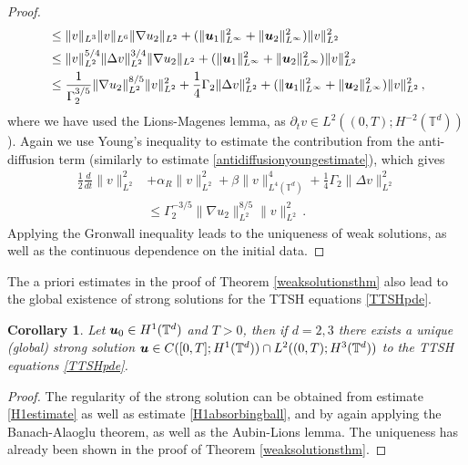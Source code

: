 \documentclass[11pt]{amsart}
\newcommand{\bu}{\mbox{\boldmath$u$}}
\newcommand{\Rb}{\beta}
\newcommand{\Gamtwo}{\Gamma_{2}}
\newtheorem{corollary}[proposition]{Corollary}
\theoremstyle{definition}
\numberwithin{equation}{section}
\numberwithin{equation}{section}
\begin{document}
\begin{proof}
\begin{align*}
&\leq \lVert v \rVert_{L^3} \lVert v \rVert_{L^6} \lVert \nabla u_2 \rVert_{L^2} + (\lVert \bu_1 \rVert_{L^\infty}^2 + \lVert \bu_2 \rVert_{L^\infty}^2) \lVert v \rVert_{L^2}^{2} \\
&\leq \lVert v \rVert_{L^2}^{5/4} \lVert \Delta v \rVert_{L^2}^{3/4} \lVert \nabla u_2 \rVert_{L^2} + (\lVert \bu_1 \rVert_{L^\infty}^2 + \lVert \bu_2 \rVert_{L^\infty}^2) \lVert v \rVert_{L^2}^2 \\
&\leq \frac{1}{\Gamtwo^{3/5}} \lVert \nabla u_2 \rVert_{L^2}^{8/5} \lVert v \rVert_{L^2}^2 + \frac{1}{4} \Gamtwo \lVert \Delta v \rVert_{L^2}^2 + (\lVert \bu_1 \rVert_{L^\infty}^2 + \lVert \bu_2 \rVert_{L^\infty}^2) \lVert v \rVert_{L^2}^{2} \,,
\end{align*}
where we have used the Lions-Magenes lemma, as $\partial_t v \in L^2 ((0,T); H^{-2} (\mathbb{T}^d))$).
Again we use Young's inequality to estimate the contribution from the anti-diffusion term (similarly to estimate \eqref{antidiffusionyoungestimate}), which gives
\begin{align} \label{differenceestimate}
\frac{1}{2} \frac{d}{d t} \lVert v \rVert_{L^2}^2 &+ \alpha_{R} \lVert v \rVert_{L^2}^2 + \Rb \lVert v \rVert_{L^4 (\mathbb{T}^d)}^4 + \frac{1}{4} \Gamtwo \lVert \Delta v \rVert_{L^2}^2 \\
&\leq \Gamtwo^{-3/5} \lVert \nabla u_2 \rVert_{L^2}^{8/5} \lVert v \rVert_{L^2}^2\,. \nonumber
\end{align}
Applying the Gronwall inequality leads to the uniqueness of weak solutions, as well as the continuous dependence on the initial data.
\end{proof}
The a priori estimates in the proof of Theorem \ref{weaksolutionsthm} also lead to the global existence of strong solutions for the TTSH equations \eqref{TTSHpde}.
\begin{corollary}
Let $\bu_0 \in H^1 (\mathbb{T}^d)$ and $T > 0$, then if $d=2,3$ there exists a unique (global) strong solution $\bu \in C([0,T]; H^1 (\mathbb{T}^d)) \cap L^2 ((0,T); H^3 (\mathbb{T}^d))$ to the TTSH equations \eqref{TTSHpde}.
\end{corollary}
\begin{proof}
The regularity of the strong solution can be obtained from estimate \eqref{H1estimate} as well as estimate \eqref{H1absorbingball}, and by again applying the Banach-Alaoglu theorem, as well as the Aubin-Lions lemma. The uniqueness has already been shown in the proof of Theorem \ref{weaksolutionsthm}.
\end{proof}
\end{document}

